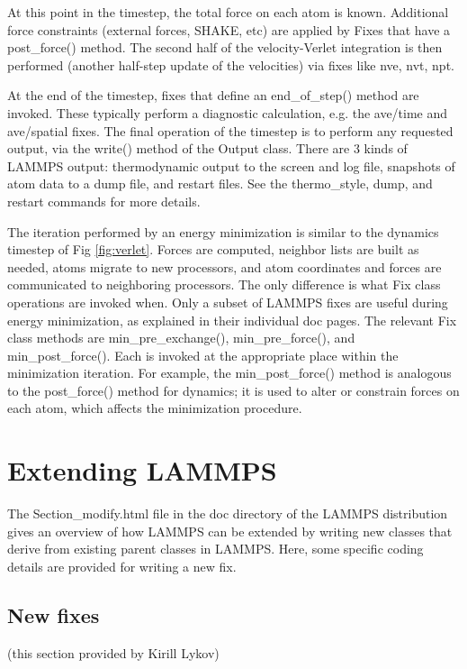 \documentclass{article}
\begin{document}
At this point in the timestep, the total force on each atom is known.
Additional force constraints (external forces, SHAKE, etc) are applied
by Fixes that have a post\_force() method.  The second half of the
velocity-Verlet integration is then performed (another half-step
update of the velocities) via fixes like nve, nvt, npt.

At the end of the timestep, fixes that define an end\_of\_step()
method are invoked.  These typically perform a diagnostic calculation,
e.g. the ave/time and ave/spatial fixes.  The final operation of the
timestep is to perform any requested output, via the write() method of
the Output class.  There are 3 kinds of LAMMPS output: thermodynamic
output to the screen and log file, snapshots of atom data to a dump
file, and restart files.  See the thermo\_style, dump, and restart
commands for more details.

The iteration performed by an energy minimization is similar to the
dynamics timestep of Fig \ref{fig:verlet}.  Forces are computed,
neighbor lists are built as needed, atoms migrate to new processors,
and atom coordinates and forces are communicated to neighboring
processors.  The only difference is what Fix class operations are
invoked when.  Only a subset of LAMMPS fixes are useful during energy
minimization, as explained in their individual doc pages.  The
relevant Fix class methods are min\_pre\_exchange(),
min\_pre\_force(), and min\_post\_force().  Each is invoked at the
appropriate place within the minimization iteration.  For example, the
min\_post\_force() method is analogous to the post\_force() method for
dynamics; it is used to alter or constrain forces on each atom, which
affects the minimization procedure.

\pagebreak
\section{Extending LAMMPS}

The Section\_modify.html file in the doc directory of
the LAMMPS distribution gives an overview of how LAMMPS can
be extended by writing new classes that derive from existing
parent classes in LAMMPS.  Here, some specific coding
details are provided for writing a new fix.

\subsection{New fixes}

(this section provided by Kirill Lykov)
\vspace{0.25cm}
\end{document}
